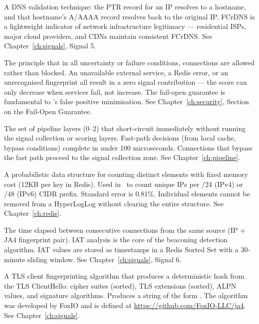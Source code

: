 \begin{description}[leftmargin=0pt, style=nextline, itemsep=8pt]
  \item[FCrDNS (Forward-confirmed reverse DNS)\index{FCrDNS}]
  A DNS validation technique: the PTR record for an IP resolves to a hostname, and
  that hostname's A/AAAA record resolves back to the original IP. FCrDNS is a
  lightweight indicator of network infrastructure legitimacy — residential ISPs,
  major cloud providers, and CDNs maintain consistent FCrDNS.
  See Chapter~\ref{ch:signals}, Signal 5.

  \item[Fail open\index{fail open}]
  The principle that in all uncertainty or failure conditions, connections are allowed
  rather than blocked. An unavailable external service, a Redis error, or an
  unrecognised fingerprint all result in a zero signal contribution — the score can
  only decrease when services fail, not increase. The fail-open guarantee is fundamental
  to \ja's false positive minimisation.
  See Chapter~\ref{ch:security}, Section on the Fail-Open Guarantee.

  \item[Fast path\index{fast path}]
  The set of pipeline layers (0–2) that short-circuit immediately without running
  the signal collection or scoring layers. Fast-path decisions (from local cache,
  bypass conditions) complete in under 100 microseconds. Connections that bypass
  the fast path proceed to the signal collection zone.
  See Chapter~\ref{ch:pipeline}.

  \item[HyperLogLog\index{HyperLogLog}]
  A probabilistic data structure for counting distinct elements with fixed memory
  cost (12KB per key in Redis). Used in \ja\ to count unique IPs per /24 (IPv4)
  or /48 (IPv6) CIDR prefix. Standard error is 0.81\%. Individual elements cannot
  be removed from a HyperLogLog without clearing the entire structure.
  See Chapter~\ref{ch:redis}.

  \item[IAT (Inter-arrival time)\index{IAT}]
  The time elapsed between consecutive connections from the same source (IP + JA4
  fingerprint pair). IAT analysis is the core of the beaconing detection algorithm.
  IAT values are stored as timestamps in a Redis Sorted Set with a 30-minute
  sliding window.
  See Chapter~\ref{ch:signals}, Signal 6.

  \item[JA4\index{JA4}]
  A TLS client fingerprinting algorithm that produces a deterministic hash from the
  TLS ClientHello: cipher suites (sorted), TLS extensions (sorted), ALPN values, and
  signature algorithms. Produces a string of the form
  . The algorithm was developed
  by FoxIO and is defined at \url{https://github.com/FoxIO-LLC/ja4}.
  See Chapter~\ref{ch:signals}.


\end{description}
